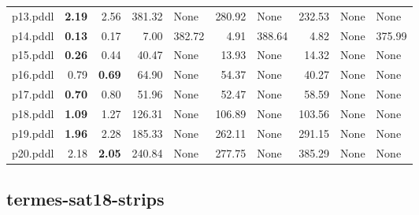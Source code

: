 \documentclass{article}
\begin{document}
\begin{tabular}{@{}lrrrrrrrrr@{}}
p13.pddl & \textbf{2.19} & 2.56 & 381.32 & \multicolumn{1}{|l|}{None} & 280.92 & \multicolumn{1}{|l|}{None} & 232.53 & \multicolumn{1}{|l|}{None} & \multicolumn{1}{|l|}{None} \\
p14.pddl & \textbf{0.13} & 0.17 & 7.00 & 382.72 & 4.91 & 388.64 & 4.82 & \multicolumn{1}{|l|}{None} & 375.99 \\
p15.pddl & \textbf{0.26} & 0.44 & 40.47 & \multicolumn{1}{|l|}{None} & 13.93 & \multicolumn{1}{|l|}{None} & 14.32 & \multicolumn{1}{|l|}{None} & \multicolumn{1}{|l|}{None} \\
p16.pddl & 0.79 & \textbf{0.69} & 64.90 & \multicolumn{1}{|l|}{None} & 54.37 & \multicolumn{1}{|l|}{None} & 40.27 & \multicolumn{1}{|l|}{None} & \multicolumn{1}{|l|}{None} \\
p17.pddl & \textbf{0.70} & 0.80 & 51.96 & \multicolumn{1}{|l|}{None} & 52.47 & \multicolumn{1}{|l|}{None} & 58.59 & \multicolumn{1}{|l|}{None} & \multicolumn{1}{|l|}{None} \\
p18.pddl & \textbf{1.09} & 1.27 & 126.31 & \multicolumn{1}{|l|}{None} & 106.89 & \multicolumn{1}{|l|}{None} & 103.56 & \multicolumn{1}{|l|}{None} & \multicolumn{1}{|l|}{None} \\
p19.pddl & \textbf{1.96} & 2.28 & 185.33 & \multicolumn{1}{|l|}{None} & 262.11 & \multicolumn{1}{|l|}{None} & 291.15 & \multicolumn{1}{|l|}{None} & \multicolumn{1}{|l|}{None} \\
p20.pddl & 2.18 & \textbf{2.05} & 240.84 & \multicolumn{1}{|l|}{None} & 277.75 & \multicolumn{1}{|l|}{None} & 385.29 & \multicolumn{1}{|l|}{None} & \multicolumn{1}{|l|}{None} \\
\end{tabular}

\hypertarget{search_start_time-termes-sat18-strips}{}
\subsection*{termes-sat18-strips}
\end{document}
